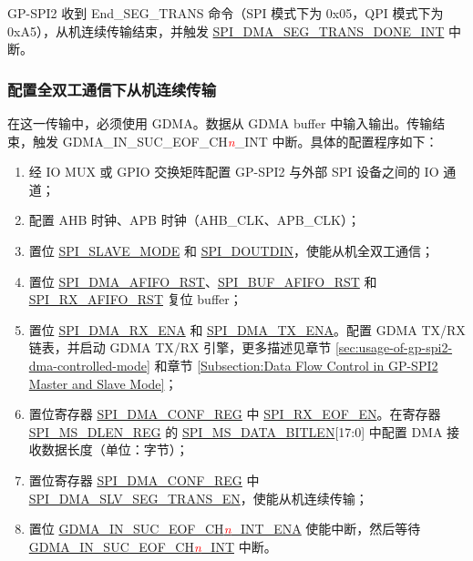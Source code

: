 \documentclass[main\_\_CN.tex]{subfiles}
\begin{document}
GP-SPI2 收到 End\_SEG\_TRANS 命令（SPI 模式下为 0x05，QPI 模式下为 0xA5），从机连续传输结束，并触发 \hyperref[int:SPIDMASEGTRANSDONEINT]{SPI\_DMA\_SEG\_TRANS\_DONE\_INT} 中断。

\subsubsection{配置全双工通信下从机连续传输}\label{sec:gp-spi2-slave-fd-seg-trans}
在这一传输中，必须使用 GDMA。数据从 GDMA buffer 中输入输出。传输结束，触发 GDMA\_IN\_SUC\_EOF\_CH\textcolor{red}{\it{n}}\_INT  中断。具体的配置程序如下：

\begin{enumerate}
   \item 经 IO MUX 或 GPIO 交换矩阵配置 GP-SPI2 与外部 SPI 设备之间的 IO 通道； 
   \item 配置 AHB 时钟、APB 时钟（AHB\_CLK、APB\_CLK）；

    \item 置位 \hyperref[fielddesc:SPISLAVEMODE]{SPI\_SLAVE\_MODE} 和 \hyperref[fielddesc:SPIDOUTDIN]{SPI\_DOUTDIN}，使能从机全双工通信；
    
    \item 置位 \hyperref[fielddesc:SPIDMAAFIFORST]{SPI\_DMA\_AFIFO\_RST}、\hyperref[fielddesc:SPIBUFAFIFORST]{SPI\_BUF\_AFIFO\_RST} 和 \hyperref[fielddesc:SPIRXAFIFORST]{SPI\_RX\_AFIFO\_RST} 复位 buffer；
        
    \item 置位 \hyperref[fielddesc:SPIDMARXENA]{SPI\_DMA\_RX\_ENA} 和 \hyperref[fielddesc:SPIDMATXENA]{SPI\_DMA\_TX\_ENA}。配置 GDMA TX/RX 链表，并启动 GDMA TX/RX 引擎，更多描述见章节 \ref{sec:usage-of-gp-spi2-dma-controlled-mode} 和章节 \ref{Subsection:Data Flow Control in GP-SPI2 Master and Slave Mode}；
    
    \item 置位寄存器 \hyperref[regdesc:SPIDMACONFREG]{SPI\_DMA\_CONF\_REG} 中 \hyperref[fielddesc:SPIRXEOFEN]{SPI\_RX\_EOF\_EN}。在寄存器 \hyperref[regdesc:SPIMSDLENREG]{SPI\_MS\_DLEN\_REG} 的 \hyperref[fielddesc:SPIMSDATABITLEN]{SPI\_MS\_DATA\_BITLEN}[17:0] 中配置 DMA 接收数据长度（单位：字节）；
    
    \item 置位寄存器 \hyperref[regdesc:SPIDMACONFREG]{SPI\_DMA\_CONF\_REG} 中 \hyperref[fielddesc:SPIDMASLVSEGTRANSEN]{SPI\_DMA\_SLV\_SEG\_TRANS\_EN}，使能从机连续传输；
    
    \item 置位 \hyperref[fielddesc:GDMAINSUCEOFCHNINTENA]{GDMA\_IN\_SUC\_EOF\_CH\textcolor{red}{\it{n}}\_INT\_ENA}  使能中断，然后等待 \hyperref[int:GDMAINSUCEOFINT]{GDMA\_IN\_SUC\_EOF\_CH\textcolor{red}{\it{n}}\_INT} 中断。
\end{enumerate}
\end{document}
